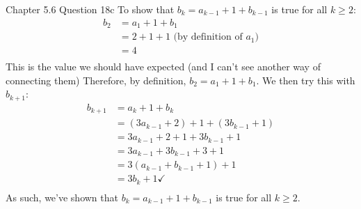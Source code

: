 \documentclass[11pt]{article}
\begin{document}
    \begin{problem}{Chapter 5.6 Question 18c}
        To show that $b_k = a_{k-1} + 1 + b_{k-1}$ is true for all $k \geq 2$:
        \begin{equation*}
            \begin{split}
                b_2 & = a_1 + 1 + b_1 \\
                & = 2 + 1 + 1 \text{ (by definition of $a_1$)} \\
                & = 4 \\
            \end{split}
        \end{equation*}
        This is the value we should have expected (and I can't see another
        way of connecting them) Therefore, by definition, $b_2 = a_1 + 1 + b_1$.
        We then try this with $b_{k+1}$:
        \begin{equation*}
            \begin{split}
                b_{k+1} & = a_k + 1 + b_k \\
                & = (3a_{k-1} + 2) + 1 + (3b_{k-1} + 1) \\
                & = 3a_{k-1} + 2 + 1 + 3b_{k-1} + 1 \\
                & = 3a_{k-1} + 3b_{k-1} + 3 + 1 \\
                & = 3(a_{k-1} + b_{k-1} + 1) + 1 \\
                & = 3b_k + 1 \checkmark \\
            \end{split}
        \end{equation*}
        As such, we've shown that $b_k = a_{k-1} + 1 + b_{k-1}$ is true for all $k \geq 2$.
    \end{problem}
\end{document}
